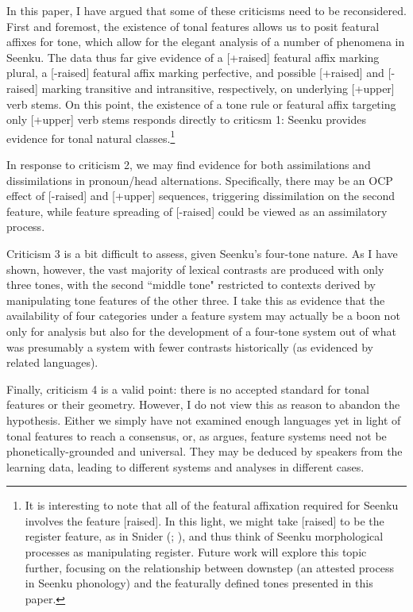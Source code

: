 \documentclass[output=paper]{langsci/langscibook}
\begin{document}
In this paper, I have argued that some of these criticisms need to be reconsidered. First and foremost, the existence of tonal features allows us to posit featural affixes for tone, which allow for the elegant analysis of a number of phenomena in Seenku. The data thus far give evidence of a {[+raised]} featural affix marking plural, a {[-raised]} featural affix marking perfective, and possible [+raised] and \mbox{[-raised]} marking transitive and intransitive, respectively, on underlying [+upper] verb stems. On this point, the existence of a tone rule or featural affix targeting only [+upper] verb stems responds directly to criticsm 1: Seenku provides evidence for tonal natural classes.\footnote{It is interesting to note that all of the featural affixation required for Seenku involves the feature [raised]. In this light, we might take [raised] to be the register feature, as in Snider (\citeyear{Snider90}; \citeyear{Snider98}), and thus think of Seenku morphological processes as manipulating register. Future work will explore this topic further, focusing on the relationship between downstep (an attested process in Seenku phonology) and the featurally defined tones presented in this paper.}

In response to criticism 2, we may find evidence for both assimilations and dissimilations in pronoun/head alternations. Specifically, there may be an OCP effect of [-raised] and [+upper] sequences, triggering dissimilation on the second feature, while feature spreading of [-raised] could be viewed as an assimilatory process.

Criticism 3 is a bit difficult to assess, given Seenku's four-tone nature. As I have shown, however, the vast majority of lexical contrasts are produced with only three tones, with the second ``middle tone" restricted to contexts derived by manipulating tone features of the other three. I take this as evidence that the availability of four categories under a feature system may actually be a boon not only for analysis but also for the development of a four-tone system out of what was presumably a system with fewer contrasts historically (as evidenced by related  languages).

Finally, criticism 4 is a valid point: there is no accepted standard for tonal features or their geometry. However, I do not view this as reason to abandon the hypothesis. Either we simply have not examined enough languages yet in light of tonal features to reach a consensus, or, as \citet{Odden10} argues, feature systems need not be phonetically-grounded and universal. They may be deduced by speakers from the learning data, leading to different systems and analyses in different cases. 
\end{document}
